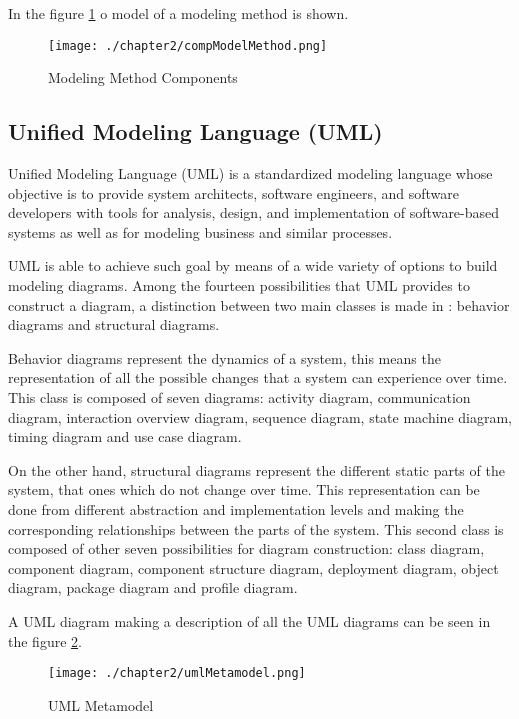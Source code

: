 In the figure \ref{fig:Modeling Method Components} o model of a modeling method is shown.

\begin{figure}
\centering
{\texttt{[image: ./chapter2/compModelMethod.png]}}
\caption{Modeling Method Components}
\label{fig:Modeling Method Components}
\end{figure}

\subsection{Unified Modeling Language (UML)}

Unified Modeling Language (UML) is a standardized modeling language whose objective is to provide system architects, software engineers, and software developers with tools for analysis, design, and implementation of software-based systems as well as for modeling business and similar processes.

UML is able to achieve such goal by means of a wide variety of options to build modeling diagrams. Among the fourteen possibilities that UML provides to construct a diagram, a distinction between two main classes is made in \cite{umlwebsite}: behavior diagrams and structural diagrams.

Behavior diagrams represent the dynamics of a system, this means the representation of all the possible changes that a system can experience over time. This class is composed of seven diagrams: activity diagram, communication diagram, interaction overview diagram, sequence diagram, state machine diagram, timing diagram and use case diagram.

On the other hand, structural diagrams represent the different static parts of the system, that ones which do not change over time. This representation can be done from different abstraction and implementation levels and making the corresponding relationships between the parts of the system. This second class is composed of other seven possibilities for diagram construction: class diagram, component diagram, component structure diagram, deployment diagram, object diagram, package diagram and profile diagram.

A UML diagram making a description of all the UML diagrams can be seen in the figure \ref{fig:UML Metamodel}.

\begin{figure}
\centering
{\texttt{[image: ./chapter2/umlMetamodel.png]}}
\caption{UML Metamodel}
\label{fig:UML Metamodel}
\end{figure}

